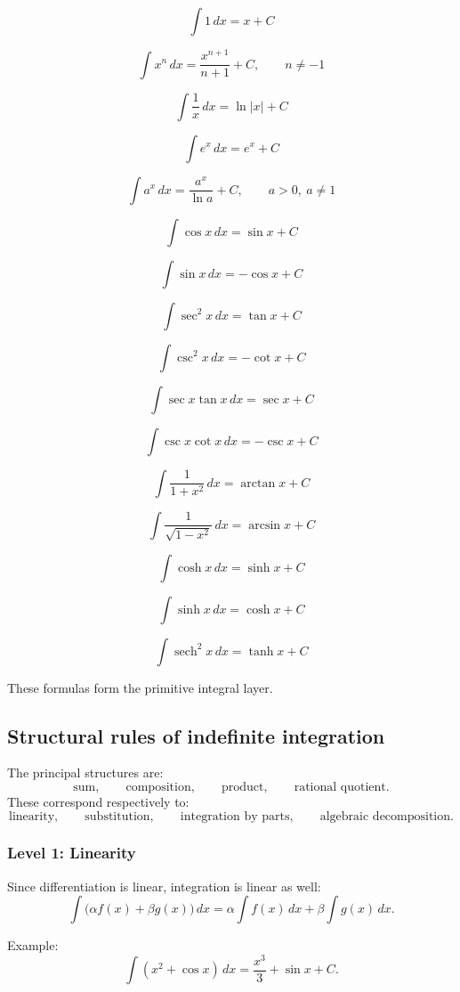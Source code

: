 \documentclass{article}
\begin{document}
	\[
	\int 1\,dx = x + C
	\]
	
	\[
	\int x^n\,dx = \frac{x^{n+1}}{n+1}+C,\qquad n\neq -1
	\]
	
	\[
	\int \frac{1}{x}\,dx = \ln|x|+C
	\]
	
	\[
	\int e^x\,dx = e^x+C
	\]
	
	\[
	\int a^x\,dx = \frac{a^x}{\ln a}+C,
	\qquad a>0,\ a\neq 1
	\]
	
	\[
	\int \cos x\,dx = \sin x+C
	\]
	
	\[
	\int \sin x\,dx = -\cos x+C
	\]
	
	\[
	\int \sec^2 x\,dx = \tan x+C
	\]
	
	\[
	\int \csc^2 x\,dx = -\cot x+C
	\]
	
	\[
	\int \sec x\tan x\,dx = \sec x+C
	\]
	
	\[
	\int \csc x\cot x\,dx = -\csc x+C
	\]
	
	\[
	\int \frac{1}{1+x^2}\,dx = \arctan x+C
	\]
	
	\[
	\int \frac{1}{\sqrt{1-x^2}}\,dx = \arcsin x+C
	\]
	
	\[
	\int \cosh x\,dx = \sinh x+C
	\]
	
	\[
	\int \sinh x\,dx = \cosh x+C
	\]
	
	\[
	\int \operatorname{sech}^2 x\,dx = \tanh x+C
	\]
	
	These formulas form the primitive integral layer.
	
	\subsection{Structural rules of indefinite integration}
	
	The principal structures are:
	\[
	\text{sum},\qquad \text{composition},\qquad \text{product},\qquad \text{rational quotient}.
	\]
	These correspond respectively to:
	\[
	\text{linearity},\qquad \text{substitution},\qquad \text{integration by parts},\qquad \text{algebraic decomposition}.
	\]
	
	\subsubsection{Level 1: Linearity}
	
	Since differentiation is linear, integration is linear as well:
	\[
	\int \bigl(\alpha f(x)+\beta g(x)\bigr)\,dx
	=
	\alpha\int f(x)\,dx+\beta\int g(x)\,dx.
	\]
	
	Example:
	\[
	\int (x^2+\cos x)\,dx
	=
	\frac{x^3}{3}+\sin x+C.
	\]
	
\end{document}

